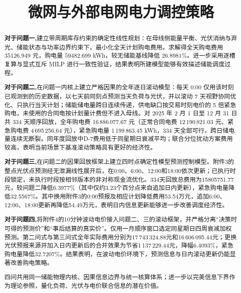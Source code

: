 \documentclass[withoutpreface,bwprint]{cumcmthesis}
\title{微网与外部电网电力调控策略}  %
\begin{document}
	
\maketitle
\begin{abstract}


\textbf{对于问题一,}建立带周期库存约束的确定性线性规划：在母线侧能量平衡、光伏消纳与弃光、储能状态与功率边界约束下，最小化全天计划购电费用。求解得全天购电费用 $35126.949$ 元，购电量 $59482.699$ kWh，较无储能基线降低 $26.8981\%$。进一步采用逐槽复算与显式互斥 MILP 进行一致性验证，结果表明所建模型能够有效描述储能调度过程。

\textbf{对于问题二,}在问题一内核上建立严格因果的全年逐日滚动模型：每天 0:00 仅用该时刻已观测到的历史数据，以七天前同刻点预测当天负荷与光伏，并以滚动 7 天视野协同优化、只执行当天计划；储能储电量跨日连续传递，供电缺口按交易时刻电价的 5 倍紧急购电，未使用的合同电按计划量计费但不进入母线。对 2025 年 2 月 1 日至 12 月 31 日共 334 天顺序回放，全年购电费 16\,886\,077.67 元（正常合同电费 12\,190\,821.03 元、紧急购电费 4\,695\,256.64 元），紧急购电量 1\,199\,863.45 kWh，334 天全部可行，跨日储电量连续无断裂。同年度回放中D-7费用低于同星期日衰减平均；联合分位扰动方案费用较高，表明当前场景下基准滚动策略具有更好的经济性。

\textbf{对于问题三,}在问题二的因果回放框架上建立四时点确定性模型预测控制模型。附件3的整点光伏点预测经无泄漏线性展开后，在0:00、6:00、12:00和18:00依次更新；已执行时段锁定，未执行时段按相邻版本的非对称现金流优化。334天回放总费用为15805751.77元，较问题二降低6.3977\%（其中仅约3.23个百分点来自追加日内更新），紧急购电量降低32.5567\%。其中换用附件3的0:00预报及相应计划降低费用53.54万元，追加6:00、12:00、18:00更新再降低54.49万元，表明日内信息更新能够进一步改善调度经济性。

\textbf{对于问题四,}将附件4的10分钟波动电价接入问题二、三的滚动框架，并严格分离“决策时可得的预测价”和“事后结算的真实价”。仅用一月顺序窗口选定同星期日四周衰减加权预测。第二问式与第三问式全年实际费用分别为17\,743\,324.88元和16\,606\,095.44元；更换光伏预报来源并加入日内更新后的合并效果为节省1\,137\,229.44元，降幅6.4093\%，紧急购电量降低32.7207\%。结果表明，在波动电价环境下，预测信息与日内滚动更新仍能显著改善购电策略。

四问共用同一储能物理内核、因果信息边界与统一核算体系；进一步以完美信息下界作为理论参照，量化负荷、光伏与电价联合信息的潜在价值。




\end{abstract}
\end{document}
